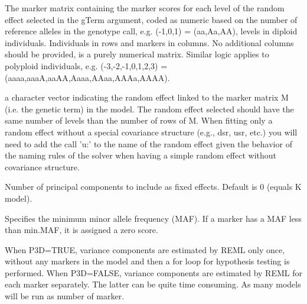 \documentclass[a4paper]{book}
\begin{document}
\begin{Arguments}
\begin{ldescription}
\item[\code{M}] The marker matrix containing the marker scores for each level of the random effect selected in the gTerm argument, coded as numeric based on the number of reference alleles in the genotype call, e.g. (-1,0,1) = (aa,Aa,AA), levels in diploid individuals. Individuals in rows and markers in columns. No additional columns should be provided, is a purely numerical matrix. Similar logic applies to polyploid individuals, e.g. (-3,-2,-1,0,1,2,3) = (aaaa,aaaA,aaAA,Aaaa,AAaa,AAAa,AAAA). 
\item[\code{gTerm}] a character vector indicating the random effect linked to the marker matrix M (i.e. the genetic term) in the model. The random effect selected should have the same number of levels than the number of rows of M. When fitting only a random effect without a special covariance structure (e.g., dsr, usr, etc.) you will need to add the call 'u:' to the name of the random effect given the behavior of the naming rules of the solver when having a simple random effect without covariance structure. 
\item[\code{n.PC}] Number of principal components to include as fixed effects. Default is 0 (equals K model).
\item[\code{min.MAF}] Specifies the minimum minor allele frequency (MAF). If a marker has a MAF less than min.MAF, it is assigned a zero score.
\item[\code{P3D}] When P3D=TRUE, variance components are estimated by REML only once, without any markers in the model and then a for loop for hypothesis testing is performed. When P3D=FALSE, variance components are estimated by REML for each marker separately. The latter can be quite time consuming. As many models will be run as number of marker.

\end{ldescription}
\end{Arguments}
%
\end{document}
